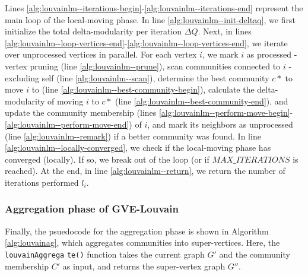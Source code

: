 Lines \ref{alg:louvainlm--iterations-begin}-\ref{alg:louvainlm--iterations-end} represent the main loop of the local-moving phase. In line \ref{alg:louvainlm--init-deltaq}, we first initialize the total delta-modularity per iteration $\Delta Q$. Next, in lines \ref{alg:louvainlm--loop-vertices-end}-\ref{alg:louvainlm--loop-vertices-end}, we iterate over unprocessed vertices in parallel. For each vertex $i$, we mark $i$ as processed - vertex pruning (line \ref{alg:louvainlm--prune}), scan communities connected to $i$ - excluding self (line \ref{alg:louvainlm--scan}), determine the best community $c*$ to move $i$ to (line \ref{alg:louvainlm--best-community-begin}), calculate the delta-modularity of moving $i$ to $c*$ (line \ref{alg:louvainlm--best-community-end}), and update the community membership  (lines \ref{alg:louvainlm--perform-move-begin}-\ref{alg:louvainlm--perform-move-end}) of $i$, and mark its neighbors as unprocessed (line \ref{alg:louvainlm--remark}) if a better community was found. In line \ref{alg:louvainlm--locally-converged}, we check if the local-moving phase has converged (locally). If so, we break out of the loop (or if $MAX\_ITERATIONS$ is reached). At the end, in line \ref{alg:louvainlm--return}, we return the number of iterations performed $l_i$.


\subsubsection{Aggregation phase of GVE-Louvain}

Finally, the psuedocode for the aggregation phase is shown in Algorithm \ref{alg:louvainag}, which aggregates communities into super-vertices. Here, the \texttt{louvainAggrega} \texttt{te()} function takes the current graph $G'$ and the community membership $C'$ as input, and returns the super-vertex graph $G''$.

